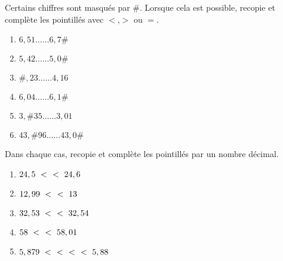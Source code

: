 \begin{exercice}
Certains chiffres sont masqués par \#. Lorsque cela est possible, recopie et complète les pointillés avec $<$,$>$ ou $=$.
\begin{enumerate} 
 \item $6,51 …… 6,7\#$
 \item $5,42 …… 5,0\#$
 \item $\#,23 …… 4,16$
 \item $6,04 …… 6,1\#$
 \item $3,\#35 …… 3,01$
 \item $43,\#96 …… 43,0\#$ %
 \end{enumerate}
\end{exercice}


\begin{exercice}
Dans chaque cas, recopie et complète les pointillés par un nombre décimal.
\begin{enumerate} 
 \item $24,5 < \dotfill < 24,6$ \hspace*{13em} %
 
 \item $12,99 < \dotfill < 13$ \hspace*{13.5em}
 
 \item $32,53 < \dotfill < 32,54$ \hspace*{12em}
 
 \item $58 < \dotfill < 58,01$ \hspace*{13.5em}
 
 \item $5,879 < \dotfill < \dotfill < \dotfill < 5,88$ \hspace*{5em}

 \end{enumerate}
\end{exercice}




